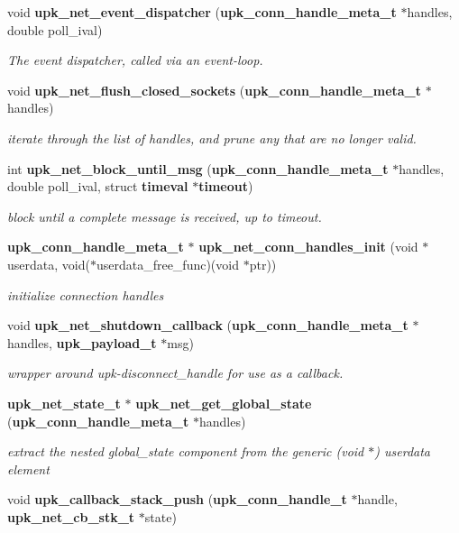 \begin{DoxyCompactItemize}
void {\bf upk\_\-net\_\-event\_\-dispatcher} ({\bf upk\_\-conn\_\-handle\_\-meta\_\-t} $\ast$handles, double poll\_\-ival)
\begin{DoxyCompactList}\small\item\em The event dispatcher, called via an event-\/loop. \end{DoxyCompactList}\item 
void {\bf upk\_\-net\_\-flush\_\-closed\_\-sockets} ({\bf upk\_\-conn\_\-handle\_\-meta\_\-t} $\ast$handles)
\begin{DoxyCompactList}\small\item\em iterate through the list of handles, and prune any that are no longer valid. \end{DoxyCompactList}\item 
int {\bf upk\_\-net\_\-block\_\-until\_\-msg} ({\bf upk\_\-conn\_\-handle\_\-meta\_\-t} $\ast$handles, double poll\_\-ival, struct {\bf timeval} $\ast${\bf timeout})
\begin{DoxyCompactList}\small\item\em block until a complete message is received, up to timeout. \end{DoxyCompactList}\item 
{\bf upk\_\-conn\_\-handle\_\-meta\_\-t} $\ast$ {\bf upk\_\-net\_\-conn\_\-handles\_\-init} (void $\ast$userdata, void($\ast$userdata\_\-free\_\-func)(void $\ast$ptr))
\begin{DoxyCompactList}\small\item\em initialize connection handles \end{DoxyCompactList}\item 
void {\bf upk\_\-net\_\-shutdown\_\-callback} ({\bf upk\_\-conn\_\-handle\_\-meta\_\-t} $\ast$handles, {\bf upk\_\-payload\_\-t} $\ast$msg)
\begin{DoxyCompactList}\small\item\em wrapper around upk-\/disconnect\_\-handle for use as a callback. \end{DoxyCompactList}\item 
{\bf upk\_\-net\_\-state\_\-t} $\ast$ {\bf upk\_\-net\_\-get\_\-global\_\-state} ({\bf upk\_\-conn\_\-handle\_\-meta\_\-t} $\ast$handles)
\begin{DoxyCompactList}\small\item\em extract the nested global\_\-state component from the generic (void $\ast$) userdata element \end{DoxyCompactList}\item 
void {\bf upk\_\-callback\_\-stack\_\-push} ({\bf upk\_\-conn\_\-handle\_\-t} $\ast$handle, {\bf upk\_\-net\_\-cb\_\-stk\_\-t} $\ast$state)

\end{DoxyCompactItemize}
